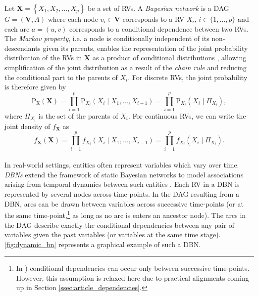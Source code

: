 
Let $\mathbf{X}=\left\{X_{1}, X_{2}, \ldots, X_{p}\right\}$ be a set of \acp{RV}. A \textit{Bayesian network} is a \ac{DAG} $G = (\bm{V},A)$ where each node $v_i \in \bm{V}$ corresponds to a \ac{RV} $X_i$, $i \in \{1, \ldots, p\}$ and each arc $a = (u,v)$ corresponds to a conditional dependence between two \acp{RV}. The \textit{Markov property}, i.e. a node is conditionally independent of its non-descendants given its parents, enables the representation of the joint probability distribution of the \acp{RV} in $\bm{X}$ as a product of conditional distributions \citep{nagarajan2013bayesian}, allowing simplification of the joint distribution as a result of the \textit{chain rule} and reducing the conditional part to the parents of $X_i$. For discrete \acp{RV}, the joint probability is therefore given by 
\begin{equation}
\mathrm{P}_{\bm{\mathrm{X}}}(\mathbf{X})=
\prod_{i=1}^{p} \mathrm{P}_{X_i}\left(X_{i} \mid X_{1}, \ldots, X_{i-1}\right) =
\prod_{i=1}^{p} \mathrm{P}_{X_{i}}\left(X_{i} \mid \Pi_{X_{i}}\right),
\end{equation}
where $\Pi_{X_{i}}$ is the set of the parents of $X_i$. For continuous \acp{RV}, we can write the joint density of $f_{\mathbf{X}}$ as
\begin{equation}
f_{\mathbf{X}}(\mathbf{X})=
\prod_{i=1}^{p} f_{X_i}\left(X_{i} \mid X_{1}, \ldots, X_{i-1}\right) =
\prod_{i=1}^{p} f_{X_{i}}\left(X_{i} \mid \Pi_{X_{i}}\right).
\end{equation}
\\

In real-world settings, entities often represent variables which vary over time. \textit{\acp{DBN}} extend the framework of static Bayesian networks to model associations arising from temporal dynamics between such entities \citep{nagarajan2013bayesian}. Each \ac{RV} in a \ac{DBN} is represented by several nodes across time-points. In the \ac{DAG} resulting from a \ac{DBN}, arcs can be drawn between variables across successive time-points (or at the same time-point,\footnote{In \cite{nagarajan2013bayesian}) conditional dependencies can occur only between successive time-points. However, this assumption is relaxed here due to practical alignments coming up in Section \ref{ssec:article_dependencies}.} as long as no arc is enters an ancestor node). The arcs in the \ac{DAG} describe exactly the conditional dependencies between any pair of variables given the past variables (or variables at the same time stage). \autoref{fig:dynamic_bn} represents a graphical example of such a \ac{DBN}.
\\


